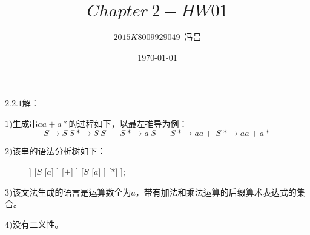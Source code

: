 \documentclass[UTF8,noindent]{ctexart}
\title{$Chapter\ 2-HW01$}
\author{$2015K8009929049$\ 冯吕}
\date{\today}
\begin{document}
\maketitle
{}
$2.2.1$解：

$1)$生成串$aa+a*$的过程如下，以最左推导为例：
\[S\rightarrow S\ S\ * \rightarrow S\ S\ + \ S\ *\rightarrow a\ S\ +\ S\ *\rightarrow aa+\ S\ *\rightarrow aa+a*\]

$2)$该串的语法分析树如下：
\begin{figure}[H]
\centering
\begin{forest}
  [{$S$}
	[{$S$}
	  [{$S$}
		[{$a$}]
	  ]
	  [{$S$}
		[{$a$}]
	  ]
	  [{$+$}]
	]
	[{$S$}
	  [{$a$}]
	]
	[{$*$}]
  ];
\end{forest}
\end{figure}

$3)$该文法生成的语言是运算数全为$a$，带有加法和乘法运算的后缀算术表达式的集合。

$4)$没有二义性。
\end{document}
